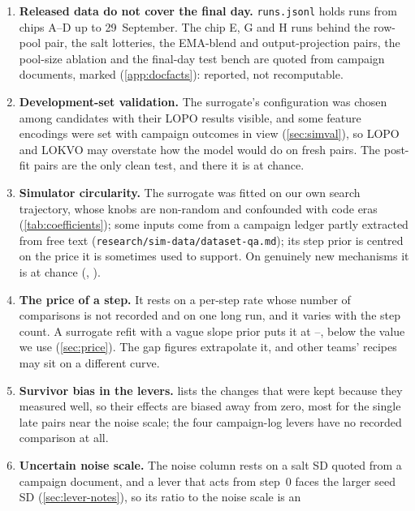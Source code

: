 \begin{enumerate}
    chip~D ran an older Neuron runtime (2.33.10, against 2.34.10 on chip~C). We normalised only same-recipe runs,
    never across a change that alters step time, and every comparison names its chip.
  \item \textbf{Released data do not cover the final day.} \texttt{runs.jsonl} holds runs from chips A--D up to 29~September.
    The chip E, G and H runs behind the row-pool pair, the salt lotteries, the EMA-blend and output-projection pairs, the
    pool-size ablation and the final-day test bench are quoted from campaign documents, marked \docnum{}
    (\cref{app:docfacts}): reported, not recomputable.
  \item \textbf{Development-set validation.} The surrogate's configuration was chosen among \docnum{}
    candidates with their LOPO results visible, and some feature encodings were set with campaign outcomes in view
    (\cref{sec:simval}), so LOPO and LOKVO may overstate how the model would do on fresh pairs. The 
    post-fit pairs are the only clean test, and there it is at chance.
  \item \textbf{Simulator circularity.} The surrogate was fitted on our own search trajectory, whose knobs are
    non-random and confounded with code eras (\cref{tab:coefficients}); some inputs come from a campaign ledger partly
    extracted from free text (\texttt{research/sim-data/dataset-qa.md}); its step prior is centred on the price it is
    sometimes used to support. On genuinely new mechanisms it is at chance (, ).
  \item \textbf{The price of a step.} It rests on a per-step rate whose number of comparisons is not recorded and on one
    long run, and it varies with the step count. A surrogate refit with a vague slope prior puts it at
    --, below the value we use (\cref{sec:price}). The gap figures
    extrapolate it, and other teams' recipes may sit on a different curve.
  \item \textbf{Survivor bias in the levers.}  lists the changes that were kept because they
    measured well, so their effects are biased away from zero, most for the single late pairs near the noise scale; the
    four campaign-log levers have no recorded comparison at all.
  \item \textbf{Uncertain noise scale.} The noise column rests on a salt SD quoted from a campaign document, and a
    lever that acts from step~0 faces the larger seed SD (\cref{sec:lever-notes}), so its ratio to the noise scale is an

\end{enumerate}
